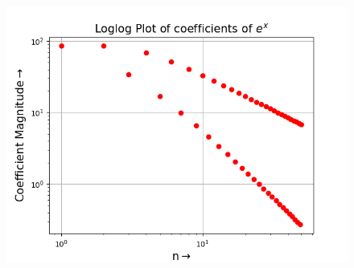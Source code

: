 \documentclass{article}
\begin{document}
\begin{figure}[h!]
	\centering
	\includegraphics[scale=0.46]{q3(b)}
	\label{fig:1(b)}
\end{figure}
\end{document}
